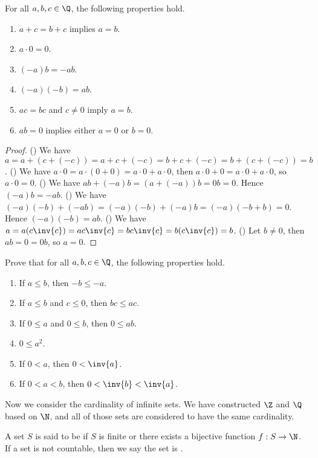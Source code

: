\documentclass[10pt]{article}
\begin{document}
\begin{proposition}
    For all $a,b,c\in\Q$, the following properties hold.
    \begin{enumerate}
        \item $a+c=b+c$ implies $a=b$.
        \item $a\cdot 0=0$.
        \item $(-a)b=-ab$.
        \item $(-a)(-b)=ab$.
        \item $ac=bc$ and $c\ne 0$ imply $a=b$.
        \item $ab=0$ implies either $a=0$ or $b=0$.
    \end{enumerate}
\end{proposition}
\begin{proof}
    () We have $a=a+(c+(-c))=a+c+(-c)=b+c+(-c)=b+(c+(-c))=b$. () We have $a\cdot 0=a\cdot(0+0)=a\cdot 0+a\cdot 0$, then $a\cdot 0+0=a\cdot 0+a\cdot 0$, so $a\cdot 0=0$. () We have $ab+(-a)b=(a+(-a))b=0b=0$. Hence $(-a)b=-ab$. () We have $(-a)(-b)+(-ab)=(-a)(-b)+(-a)b=(-a)(-b+b)=0$. Hence $(-a)(-b)=ab$. () We have $a=a(c\inv{c})=ac\inv{c}=bc\inv{c}=b(c\inv{c})=b$. () Let $b\ne 0$, then $ab=0=0b$, so $a=0$. 
\end{proof}
\begin{problem}
    Prove that for all $a,b,c\in\Q$, the following properties hold.
    \begin{enumerate}
        \item If $a\le b$, then $-b\le -a$.
        \item If $a\le b$ and $c\le 0$, then $bc\le ac$.
        \item If $0\le a$ and $0\le b$, then $0\le ab$.
        \item $0\le{a}^{2}$.
        \item If $0<a$, then $0<\inv{a}$.
        \item If $0<a<b$, then $0<\inv{b}<\inv{a}$.
    \end{enumerate}
\end{problem}
\par
Now we consider the cardinality of infinite sets. We have constructed $\Z$ and $\Q$ based on $\N$, and all of those sets are considered to have the same cardinality.
\begin{definition}
    A set $S$ is said to be  if $S$ is finite or there exists a bijective function $f:S\to\N$. If a set is not countable, then we say the set is .
\end{definition}
\end{document}
